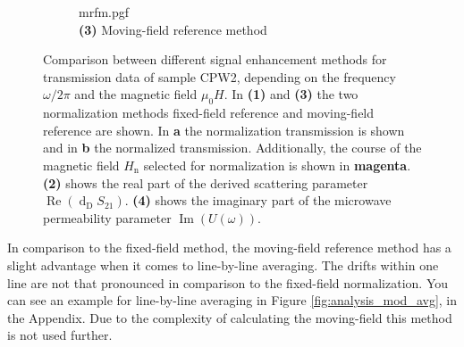 \begin{figure}
\begin{turn}{90}
\begin{subfigure}[b]{4in}
     \end{subfigure}
     \end{turn}
     \hspace{.2in}
     \begin{turn}{90}
     \begin{subfigure}[b]{4in}
         \centering
         {mrfm.pgf}\\
         \centering\small\textbf{(3)} Moving-field reference method\\
     \end{subfigure}
     \end{turn}
    \caption[Comparison between different noise reduction methods for transmission data of sample CPW2]{Comparison between different signal enhancement methods for transmission data of sample CPW2, depending on the frequency $\omega/2\pi$ and the magnetic field $\mu_0H$. In \textbf{(1)} and \textbf{(3)} the two normalization methods fixed-field reference and moving-field reference are shown. In \textbf{\color{antiseeblau100}a} the normalization transmission is shown and in \textbf{\color{antiseeblau100}b} the normalized transmission. Additionally, the course of the magnetic field ${H}_\text{n}$ selected for normalization is shown in \textbf{\color{antiseeblau100}magenta}. \textbf{(2)} shows the real part of the derived scattering parameter $\operatorname{Re}\left(\operatorname{d}_\text{D}S_{21}\right)$. \textbf{(4)} shows the imaginary part of the microwave permeability parameter $\operatorname{Im}\left(U(\omega)\right)$.}
    \label{fig:analysis_mod}
\end{figure}

In comparison to the fixed-field method, the moving-field reference method has a slight advantage when it comes to line-by-line averaging. The drifts within one line are not that pronounced in comparison to the fixed-field normalization. You can see an example for line-by-line averaging in Figure \ref{fig:analysis_mod_avg}, in the Appendix. Due to the complexity of calculating the moving-field this method is not used further.

